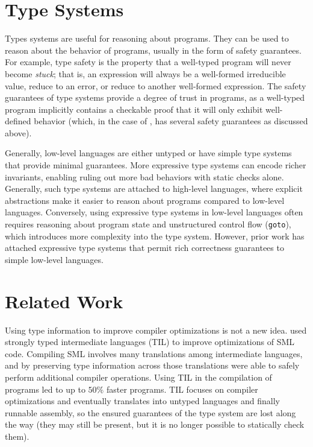 \section{Type Systems}
Types systems are useful for reasoning about programs.
They can be used to reason about the behavior of programs, usually in the form of safety guarantees.
For example, type safety is the property that a well-typed program will never become \emph{stuck}; that is, an expression will always be a well-formed irreducible value, reduce to an error, or reduce to another well-formed expression.
The safety guarantees of type systems provide a degree of trust in programs, as a well-typed program implicitly contains a checkable proof that it will only exhibit well-defined behavior (which, in the case of \wasm, has several safety guarantees as discussed above).

Generally, low-level languages are either untyped or have simple type systems that provide minimal guarantees.
More expressive type systems can encode richer invariants, enabling ruling out more bad behaviors with static checks alone.
Generally, such type systems are attached to high-level languages, where explicit abstractions make it easier to reason about programs compared to low-level languages.
Conversely, using expressive type systems in low-level languages often requires reasoning about program state and unstructured control flow (\eg \texttt{goto}), which introduces more complexity into the type system.
However, prior work has attached expressive type systems that permit rich correctness guarantees to simple low-level languages.

\section{Related Work}
\label{sec:relwork}
Using type information to improve compiler optimizations is not a new idea.
\citet{TIL} used strongly typed intermediate languages (TIL) to improve optimizations of SML code.
Compiling SML involves many translations among intermediate languages, and by preserving type information across those translations \citet{TIL} were able to safely perform additional compiler operations.
Using TIL in the compilation of programs led to up to $50\%$ faster programs.
TIL focuses on compiler optimizations and eventually translates into untyped languages and finally runnable assembly, so the ensured guarantees of the type system are lost along the way (they may still be present, but it is no longer possible to statically check them).

